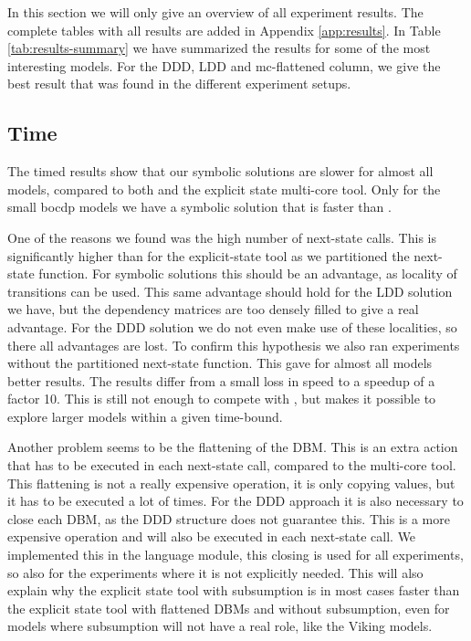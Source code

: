 In this section we will only give an overview of all experiment results. The complete tables with all results are added in Appendix \ref{app:results}. In Table \ref{tab:results-summary}  we have summarized the results for some of the most interesting models. For the DDD, LDD and mc-flattened column, we give the best result that was found in the different experiment setups. 

\subsection{Time}
The timed results show that our symbolic solutions are slower for almost all models, compared to both \uppaal{} and the explicit state multi-core tool. Only for the small bocdp models we have a symbolic solution that is faster than \uppaal{}. 

One of the reasons we found was the high number of next-state calls. This is significantly higher than for the explicit-state tool as we partitioned the next-state function. For symbolic solutions this should be an advantage, as locality of transitions can be used. This same advantage should hold for the LDD solution we have, but the dependency matrices are too densely filled to give a real advantage. For the DDD solution we do not even make use of these localities, so there all advantages are lost. To confirm this hypothesis we also ran experiments without the partitioned next-state function. This gave for almost all models better results. The results differ from a small loss in speed to a speedup of a factor 10. This is still not enough to compete with \uppaal{}, but makes it possible to explore larger models within a given time-bound. 

Another problem seems to be the flattening of the DBM. This is an extra action that has to be executed in each next-state call, compared to the multi-core tool. This flattening is not a really expensive operation, it is only copying values, but it has to be executed a lot of times. For the DDD approach it is also necessary to close each DBM, as the DDD structure does not guarantee this. This is a more expensive operation and will also be executed in each next-state call. We implemented this in the language module, this closing is used for all experiments, so also for the experiments where it is not explicitly needed. This will also explain why the explicit state tool with subsumption is in most cases faster than the explicit state tool with flattened DBMs and without subsumption, even for models where subsumption will not have a real role, like the Viking models.

